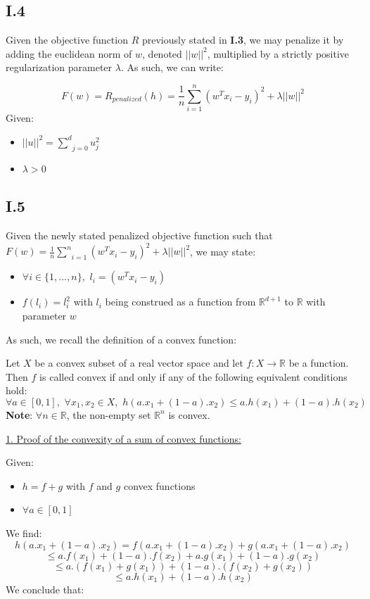 \documentclass{homework}
\begin{document}
\subsection*{I.4}

Given the objective function $R$ previously stated in \textbf{I.3}, we may penalize it by adding the euclidean norm of $w$, denoted
$||w||^2$, multiplied by a strictly positive regularization parameter $\lambda$. As such, we can write:

\textcolor{OliveGreen}{$$F(w)=R_{penalized}(h)=\frac{1}{n}\underset{i=1}{\overset{n}{\sum}}(w^Tx_i-y_i)^2+\lambda||w||^2$$
Given:
\begin{itemize}
    \item $||u||^2=\underset{j=0}{\overset{d}{\sum}}u_j^2$
    \item $\lambda > 0$
\end{itemize}}

\subsection*{I.5}

Given the newly stated penalized objective function such that $F(w)=\frac{1}{n}\underset{i=1}{\overset{n}{\sum}}(w^Tx_i-y_i)^2+\lambda||w||^2$, we may state:
\begin{itemize}
    \item $\forall i \in \{1, ..., n\},\,\, l_i = (w^Tx_i - y_i)$
    \item $f(l_i) = l_i^2$ with $l_i$ being construed as a function from $\mathbb{R}^{d+1}$ to $\mathbb{R}$ with parameter $w$
\end{itemize}

As such, we recall the definition of a convex function:

Let $X$ be a convex subset of a real vector space and let $f:X \rightarrow \mathbb{R}$ be a function.
Then $f$ is called convex if and only if any of the following equivalent conditions hold:
$$\forall a\in[0,1],\,\,\forall x_1, x_2 \in X,\,\, h(a.x_1+(1-a).x_2)\le a.h(x_1)+(1-a).h(x_2)$$
\textbf{Note}: $\forall n \in\mathbb{R}$, the non-empty set $\mathbb{R}^n$ is convex.

\underline{1. Proof of the convexity of a sum of convex functions:}

Given:
\begin{itemize}
    \item $h=f+g$ with $f$ and $g$ convex functions
    \item $\forall a\in[0,1]$
\end{itemize}
We find:
$$h(a.x_1 + (1-a).x_2)=f(a.x_1+(1-a).x_2)+g(a.x_1+(1-a).x_2)$$
$$\le a.f(x_1)+(1-a).f(x_2)+a.g(x_1)+(1-a).g(x_2)$$
$$\le a.(f(x_1)+g(x_1))+(1-a).(f(x_2)+g(x_2))$$
$$\le a.h(x_1) + (1-a).h(x_2)$$
We conclude that: 
\end{document}
